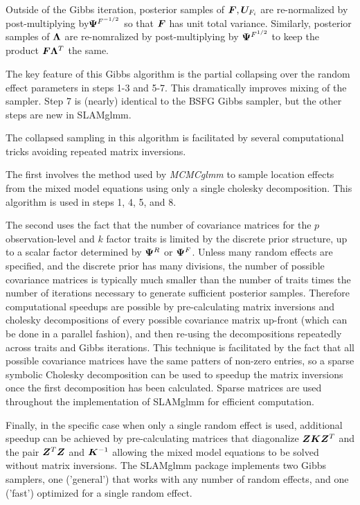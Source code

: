 \documentclass[11pt]{amsart}
\newcommand*{\B}[1]{\ifmmode\bm{#1}\else\textbf{#1}\fi}
\begin{document}
Outside of the Gibbs iteration, posterior samples of $\B{F}, \B{U}_{F_i}$ are re-normalized by post-multiplying by$\B{\Psi}^{F^{-1/2}}$ so that $\B{F}$ has unit total variance. Similarly, posterior samples of $\B{\Lambda}$ are re-nomralized by post-multiplying by $\B{\Psi}^{F^{1/2}}$ to keep the product $\B{F\Lambda}^T$ the same.


The key feature of this Gibbs algorithm is the partial collapsing over the random effect parameters in steps 1-3 and 5-7. This dramatically improves mixing of the sampler. Step 7 is (nearly) identical to the BSFG Gibbs sampler, but the other steps are new in SLAMglmm.

The collapsed sampling in this algorithm is facilitated by several computational tricks avoiding repeated matrix inversions. 

The first involves the method used by \emph{MCMCglmm} to sample location effects from the mixed model equations using only a single cholesky decomposition. This algorithm is used in steps 1, 4, 5, and 8.

The second uses the fact that the number of covariance matrices for the $p$ observation-level and $k$ factor traits is limited by the discrete prior structure, up to a scalar factor determined by $\B{\Psi}^R$ or $\B{\Psi}^F$. Unless many random effects are specified, and the discrete prior has many divisions, the number of possible covariance matrices is typically much smaller than the  number of traits times the number of iterations necessary to generate sufficient posterior samples. Therefore computational speedups are possible by pre-calculating matrix inversions and cholesky decompositions of every possible covariance matrix up-front (which can be done in a parallel fashion), and then re-using the decompositions repeatedly across traits and Gibbs iterations.
This technique is facilitated by the fact that all possible covariance matrices have the same patters of non-zero entries, so a sparse symbolic Cholesky decomposition can be used to speedup the matrix inversions once the first decomposition has been calculated. Sparse matrices are used throughout the implementation of SLAMglmm for efficient computation.

Finally, in the specific case when only a single random effect is used, additional speedup can be achieved by pre-calculating matrices that diagonalize $\B{ZKZ}^T$ and the pair $\B{Z}^T\B{Z}$ and $\B{K}^{-1}$ allowing the mixed model equations to be solved without matrix inversions. The SLAMglmm package implements two Gibbs samplers, one ('general') that works with any number of random effects, and one ('fast') optimized for a single random effect.
\end{document}
